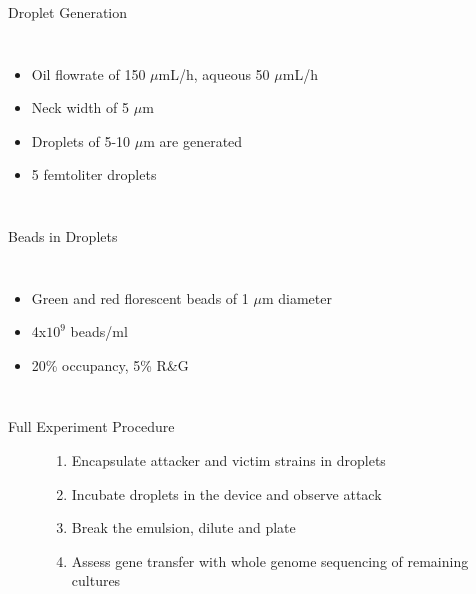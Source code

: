 \documentclass{beamer}
\begin{document}
\begin{frame}{Droplet Generation}
\begin{columns}[c] %
\begin{itemize}
\item Oil flowrate of 150 $\mu$mL/h, aqueous 50 $\mu$mL/h 
\item Neck width of 5 $\mu$m
\item Droplets of 5-10 $\mu$m are generated
\item 5 femtoliter droplets 
\end{itemize}
\end{columns}
\end{frame}

\begin{frame}{Beads in Droplets}
\begin{columns}[c] %
\begin{itemize}
\item Green and red florescent beads of 1 $\mu$m diameter
\item 4x$10^{9}$ beads/ml
\item 20\% occupancy, 5\% R\&G 
\end{itemize}
\end{columns}
\end{frame}

\begin{frame}{Full Experiment Procedure}
\begin{figure}
\begin{enumerate}
\item Encapsulate attacker and victim strains in droplets
\item Incubate droplets in the device and observe attack
\item Break the emulsion, dilute and plate
\item Assess gene transfer with whole genome sequencing of remaining cultures
\end{enumerate}
\end{figure}
\end{frame}
\end{document}
